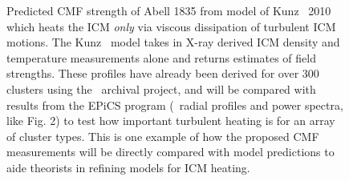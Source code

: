 \begin{figure}
\begin{center}
\begin{minipage}{0.495\linewidth}
    \end{minipage}
    \begin{minipage}{0.495\linewidth}
      \caption{Predicted CMF strength of Abell 1835 from model of Kunz
        \etal\ 2010 \citep{2010arXiv1003.2719K} which heats the ICM
                    {\it{only}} via viscous dissipation of turbulent
                    ICM motions. The Kunz \etal\ model takes in X-ray
                    derived ICM density and temperature measurements
                    alone and returns estimates of field
                    strengths. These profiles have already been
                    derived for over 300 clusters using the
                    \chandra\ archival project, and will be compared
                    with results from the EPiCS program (\eg\ radial
                    profiles and power spectra, like Fig. 2) to test
                    how important turbulent heating is for an array of
                    cluster types. This is one example of how the
                    proposed CMF measurements will be directly
                    compared with model predictions to aide theorists
                    in refining models for ICM heating.
        \label{fig:kunz}}
    \end{minipage}
  \end{center}
\end{figure}

